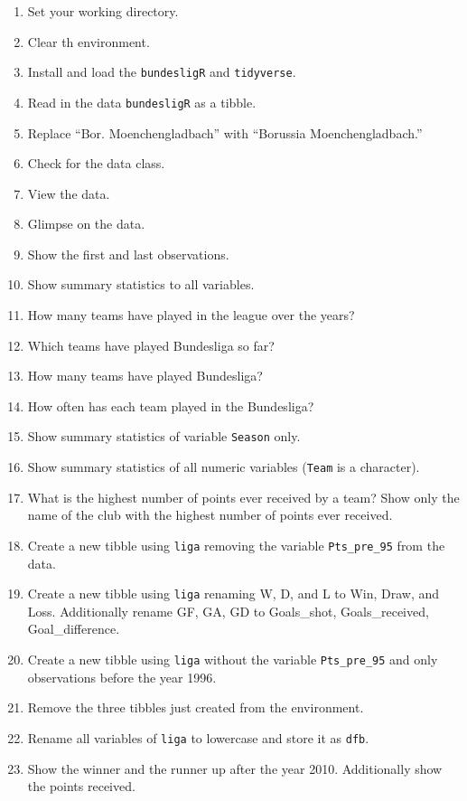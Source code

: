 \documentclass[
  12pt,
  oneside]{book}
\begin{document}
\begin{enumerate}
\def\labelenumi{\arabic{enumi}.}
\item
  Set your working directory.
\item
  Clear th environment.
\item
  Install and load the \texttt{bundesligR} and \texttt{tidyverse}.
\item
  Read in the data \texttt{bundesligR} as a tibble.
\item
  Replace ``Bor. Moenchengladbach'' with ``Borussia Moenchengladbach.''
\item
  Check for the data class.
\item
  View the data.
\item
  Glimpse on the data.
\item
  Show the first and last observations.
\item
  Show summary statistics to all variables.
\item
  How many teams have played in the league over the years?
\item
  Which teams have played Bundesliga so far?
\item
  How many teams have played Bundesliga?
\item
  How often has each team played in the Bundesliga?
\item
  Show summary statistics of variable \texttt{Season} only.
\item
  Show summary statistics of all numeric variables (\texttt{Team} is a character).
\item
  What is the highest number of points ever received by a team? Show only the name of the club with the highest number of points ever received.
\item
  Create a new tibble using \texttt{liga} removing the variable \texttt{Pts\_pre\_95} from the data.
\item
  Create a new tibble using \texttt{liga} renaming W, D, and L to Win, Draw, and Loss. Additionally rename GF, GA, GD to Goals\_shot, Goals\_received, Goal\_difference.
\item
  Create a new tibble using \texttt{liga} without the variable \texttt{Pts\_pre\_95} and only observations before the year 1996.
\item
  Remove the three tibbles just created from the environment.
\item
  Rename all variables of \texttt{liga} to lowercase and store it as \texttt{dfb}.
\item
  Show the winner and the runner up after the year 2010. Additionally show the points received.

\end{enumerate}
\end{document}
